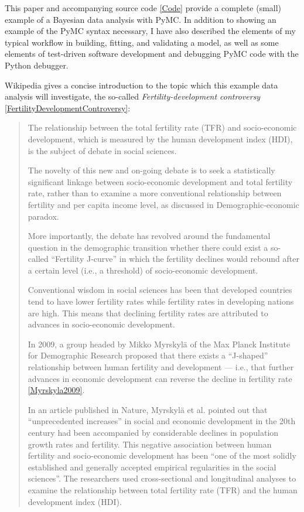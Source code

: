 \documentclass[10pt]{bmc_article}
\newenvironment{bmcformat}{\begin{raggedright}\baselineskip20pt\sloppy\setboolean{publ}{false}}{\end{raggedright}\baselineskip20pt\sloppy}
\begin{document}
\begin{bmcformat}
This paper and accompanying source code \ref{Code} provide a complete
(small) example of a Bayesian data analysis with PyMC.  In addition to
showing an example of the PyMC syntax necessary, I have also described
the elements of my typical workflow in building, fitting, and
validating a model, as well as some elements of test-driven software
development and debugging PyMC code with the Python debugger.

Wikipedia gives a concise introduction to the topic which this example data analysis will investigate, the so-called \emph{Fertility-development controversy} \ref{FertilityDevelopmentControversy}:
\begin{quote}
The relationship between the total fertility rate (TFR) and
socio-economic development, which is measured by the human development
index (HDI), is the subject of debate in social sciences.

The novelty of this new and on-going debate is to seek a statistically
significant linkage between socio-economic development and total
fertility rate, rather than to examine a more conventional
relationship between fertility and per capita income level, as
discussed in Demographic-economic paradox.

More importantly, the debate has revolved around the fundamental
question in the demographic transition whether there could exist a
so-called ``Fertility J-curve'' in which the fertility declines would
rebound after a certain level (i.e., a threshold) of socio-economic
development.

Conventional wisdom in social sciences has been that developed
countries tend to have lower fertility rates while fertility rates in
developing nations are high. This means that declining fertility rates
are attributed to advances in socio-economic development.

In 2009, a group headed by Mikko Myrskylä of the Max Planck Institute
for Demographic Research proposed that there exists a ``J-shaped''
relationship between human fertility and development — i.e., that
further advances in economic development can reverse the decline in
fertility rate \ref{Myrskyla2009}.

In an article published in Nature, Myrskylä et al. pointed out that
“unprecedented increases” in social and economic development in the
20th century had been accompanied by considerable declines in
population growth rates and fertility. This negative association
between human fertility and socio-economic development has been “one
of the most solidly established and generally accepted empirical
regularities in the social sciences”. The researchers used
cross-sectional and longitudinal analyses to examine the relationship
between total fertility rate (TFR) and the human development index
(HDI).


\end{quote}
\end{bmcformat}
\end{document}
